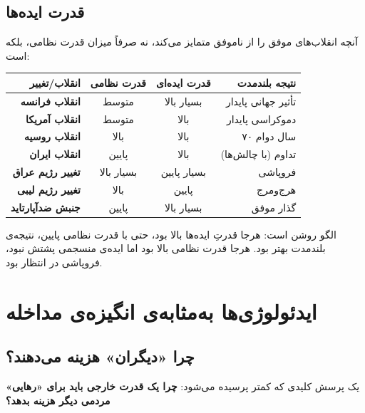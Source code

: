 \subsection{قدرت ایده‌ها}

آنچه انقلاب‌های موفق را از ناموفق متمایز می‌کند، نه صرفاً میزان قدرت
نظامی، بلکه  است:

\begin{table}[H]
\centering
\begin{tabular}{r|c|c|r}
\toprule
\textbf{انقلاب/تغییر} & \textbf{قدرت نظامی} & \textbf{قدرت ایده‌ای} &
  \textbf{نتیجه بلندمدت} \\
\midrule
\textbf{انقلاب فرانسه} & متوسط & بسیار بالا & تأثیر جهانی پایدار \\
\textbf{انقلاب آمریکا} & متوسط & بالا & دموکراسی پایدار \\
\textbf{انقلاب روسیه} & بالا & بالا & ۷۰ سال دوام \\
\textbf{انقلاب ایران} & پایین & بالا & تداوم (با چالش‌ها) \\
\textbf{تغییر رژیم عراق} & بسیار بالا & بسیار پایین & فروپاشی \\
\textbf{تغییر رژیم لیبی} & بالا & پایین & هرج‌ومرج \\
\textbf{جنبش ضدآپارتاید} & پایین & بسیار بالا & گذار موفق \\
\bottomrule
\end{tabular}
\end{table}

الگو روشن است: هرجا قدرتِ ایده‌ها بالا بود، حتی با قدرت نظامی پایین،
نتیجه‌ی بلندمدت بهتر بود. هرجا قدرت نظامی بالا بود اما ایده‌ی منسجمی
پشتش نبود، فروپاشی در انتظار بود.


\section{ایدئولوژی‌ها به‌مثابه‌ی انگیزه‌ی مداخله}
\label{sec:ch15-ideologies}

\subsection{چرا «دیگران» هزینه می‌دهند؟}

یک پرسش کلیدی که کمتر پرسیده می‌شود: \textbf{چرا یک قدرت خارجی باید
برای «رهایی» مردمی دیگر هزینه بدهد؟}

